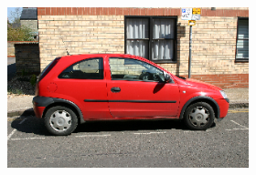 \documentclass{article} %
\begin{document}
\begin{figure}
	\begin{subfigure}[c]{\textwidth}
		\centering
		\begin{subfigure}[c]{0.195\textwidth}
			\includegraphics[width = \textwidth]{./img/7_8_s.png}
			\label{fig:7_8_s}


\end{subfigure}
\end{subfigure}
\end{figure}
\end{document}
